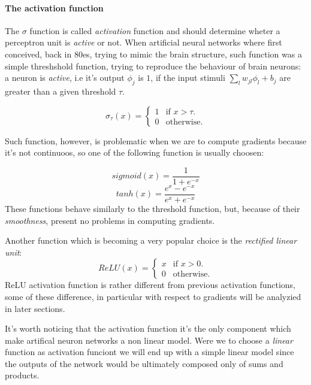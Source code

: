 \paragraph{The activation function}
The $\sigma$ function is called \textit{activation} function and should determine wheter a perceptron unit is \textit{active} or not. When artificial neural networks where first conceived, back in 80es,
trying to mimic the brain structure, such function was a simple threshshold function, trying to reproduce the behaviour of brain neurons: a neuron is \textit{active}, i.e it's output $\phi_j$ is $1$, if
the input stimuli $\sum_l w_{jl}\phi_l +b_j$ are greater than a given threshold $\tau$.

\begin{equation}
  \sigma_{\tau}(x)=\begin{cases}
    1 & \text{if $x>\tau$}.\\
    0 & \text{otherwise}.
  \end{cases}
\end{equation}

Such function, however, is problematic when we are to compute gradients because it's not continuoos, so one of the following function is usually choosen:

\begin{equation}
 sigmoid(x)=\frac{1}{1+e^{-x}}
\end{equation}
\begin{equation}
 tanh(x)=\frac{e^x-e^{-x}}{e^x+e^{-x}}
\end{equation}
These functions behave similarly to the threshold function, but, because of their \textit{smoothness}, present no problems in computing gradients.

Another function which is becoming a very popular choice is the \textit{rectified linear unit}:
\begin{equation}
  ReLU(x)=\begin{cases}
    x & \text{if $x>0$}.\\
    0 & \text{otherwise}.
  \end{cases}
\end{equation}
ReLU activation function is rather different from previous activation functions, some of these difference, in particular with respect to gradients will be analyzied in later sections.

It's worth noticing that the activation function it's the only component which make artifical neuron networks a non linear model. Were we to choose a \textit{linear} function as activation funciont we will
end up with a simple linear model since the outputs of the network would be ultimately composed only of sums and products.

